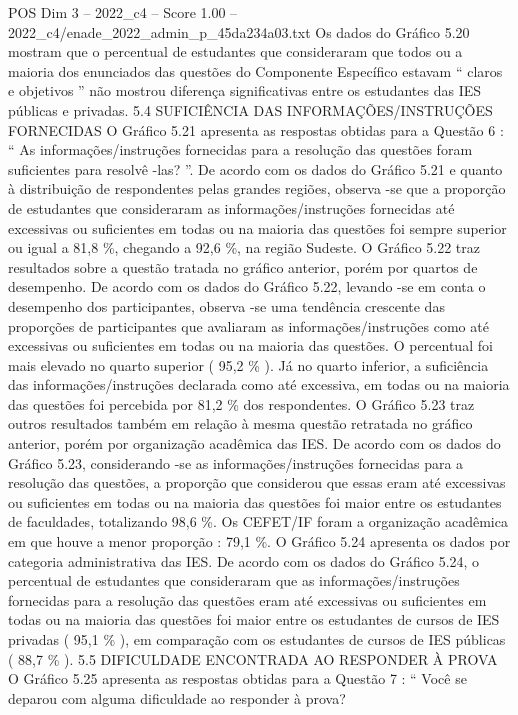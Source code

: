 \begin{textsample}{POS Dim 3 – 2022\_c4 – Score 1.00 – 2022\_c4/enade\_2022\_admin\_p\_45da234a03.txt}
Os dados do Gráfico 5.20 mostram que o percentual de estudantes que consideraram que todos ou a maioria dos enunciados das questões do Componente Específico estavam “ claros e objetivos ” não mostrou diferença significativas entre os estudantes das IES públicas e privadas. 5.4 SUFICIÊNCIA DAS INFORMAÇÕES/INSTRUÇÕES FORNECIDAS O Gráfico 5.21 apresenta as respostas obtidas para a Questão 6 : “ As informações/instruções fornecidas para a resolução das questões foram suficientes para resolvê -las? ”.
De acordo com os dados do Gráfico 5.21 e quanto à distribuição de respondentes pelas grandes regiões, observa -se que a proporção de estudantes que consideraram as informações/instruções fornecidas até excessivas ou suficientes em todas ou na maioria das questões foi sempre superior ou igual a 81,8 \%, chegando a 92,6 \%, na região Sudeste.
O Gráfico 5.22 traz resultados sobre a questão tratada no gráfico anterior, porém por quartos de desempenho.
De acordo com os dados do Gráfico 5.22, levando -se em conta o desempenho dos participantes, observa -se uma tendência crescente das proporções de participantes que avaliaram as informações/instruções como até excessivas ou suficientes em todas ou na maioria das questões.
O percentual foi mais elevado no quarto superior ( 95,2 \% ).
Já no quarto inferior, a suficiência das informações/instruções declarada como até excessiva, em todas ou na maioria das questões foi percebida por 81,2 \% dos respondentes.
O Gráfico 5.23 traz outros resultados também em relação à mesma questão retratada no gráfico anterior, porém por organização acadêmica das IES.
De acordo com os dados do Gráfico 5.23, considerando -se as informações/instruções fornecidas para a resolução das questões, a proporção que considerou que essas eram até excessivas ou suficientes em todas ou na maioria das questões foi maior entre os estudantes de faculdades, totalizando 98,6 \%.
Os CEFET/IF foram a organização acadêmica em que houve a menor proporção : 79,1 \%.
O Gráfico 5.24 apresenta os dados por categoria administrativa das IES.
De acordo com os dados do Gráfico 5.24, o percentual de estudantes que consideraram que as informações/instruções fornecidas para a resolução das questões eram até excessivas ou suficientes em todas ou na maioria das questões foi maior entre os estudantes de cursos de IES privadas ( 95,1 \% ), em comparação com os estudantes de cursos de IES públicas ( 88,7 \% ). 5.5 DIFICULDADE ENCONTRADA AO RESPONDER À PROVA O Gráfico 5.25 apresenta as respostas obtidas para a Questão 7 : “ Você se deparou com alguma dificuldade ao responder à prova?

\end{textsample}

